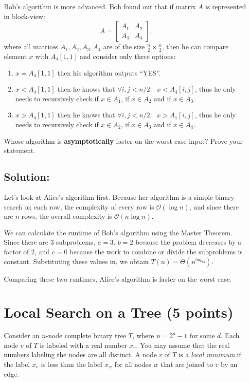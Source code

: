 \documentclass[letter,11pt]{article}
\begin{document}
Bob's algorithm is more advanced. Bob found out that if matrix $A$ is represented in block-view:
$$
A=\left[
\begin{array}{c|c}
A_1 & A_2 \\ \hline
A_3 & A_4
\end{array}\right],
$$
where all matrices $A_1, A_2, A_3, A_4$ are of the size $\frac{n}{2} \times \frac{n}{2}$, then he can compare element $x$ with $A_4[1,1]$ and consider only three options:
\begin{enumerate}
	\item $x = A_4[1,1]$ then his algorithm outputs ``YES''.
	\item $x < A_4[1,1]$ then he knows that $\forall i,j < n/2:\;\; x < A_4[i,j]$, thus he only needs to recursively check if $x \in A_1$, if $x \in A_2$ and if $x \in A_3$. 
	\item $x > A_4[1,1]$ then he knows that $\forall i,j < n/2:\;\; x > A_1[i,j]$, thus he only needs to recursively check if $x \in A_2$, if $x \in A_3$ and if $x \in A_4$.
\end{enumerate}
Whose algorithm is \textbf{asymptotically} faster on the worst case input? Prove your statement.

\subsection{Solution:}

Let's look at Alice's algorithm first. Because her algorithm is a simple binary search on each row, the complexity of every row is $\mathcal{O}(\log n)$, and since there are $n$ rows, the overall complexity is $\mathcal{O}(n \log n)$.

We can calculate the runtime of Bob's algorithm using the Master Theorem. Since there are $3$ subproblems, $a = 3$. $b = 2$ because the problem decreases by a factor of $2$, and $c = 0$ because the work to combine or divide the subproblems is constant. Substituting these values in, we obtain $T(n) = \Theta(n^{log_23})$.

Comparing these two runtimes, Alice's algorithm is faster on the worst case.


\section{Local Search on a Tree (5 points)}

Consider an $n$-node complete binary tree $T$, where $n = 2^d - 1$ for some $d$.  Each node $v$ of $T$ is labeled with a real number $x_v$.  You may assume that the real numbers labeling the nodes are all distinct. A node $v$ of $T$ is a \emph{local minimum} if the label $x_v$ is less than the label $x_w$ for all nodes $w$ that are joined to $v$ by an edge.
\end{document}
